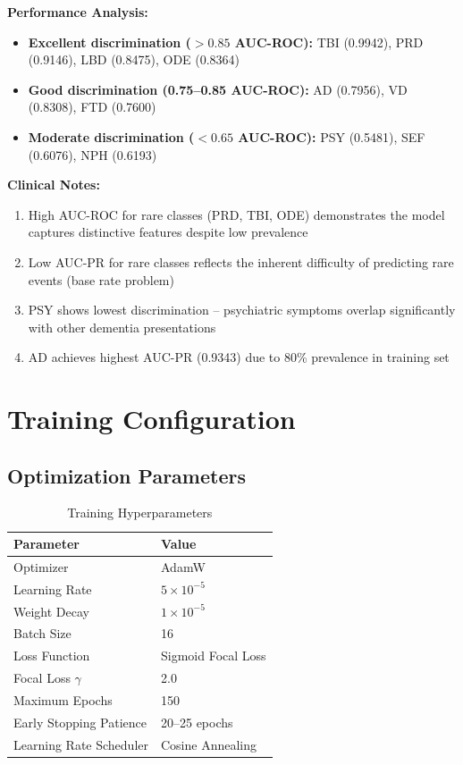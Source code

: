 \documentclass[11pt,a4paper]{article}
\begin{document}
\textbf{Performance Analysis:}
\begin{itemize}
    \item \textbf{Excellent discrimination ($>0.85$ AUC-ROC):} TBI (0.9942), PRD (0.9146), LBD (0.8475), ODE (0.8364)
    \item \textbf{Good discrimination (0.75--0.85 AUC-ROC):} AD (0.7956), VD (0.8308), FTD (0.7600)
    \item \textbf{Moderate discrimination ($<0.65$ AUC-ROC):} PSY (0.5481), SEF (0.6076), NPH (0.6193)
\end{itemize}

\textbf{Clinical Notes:}
\begin{enumerate}
    \item High AUC-ROC for rare classes (PRD, TBI, ODE) demonstrates the model captures distinctive features despite low prevalence
    \item Low AUC-PR for rare classes reflects the inherent difficulty of predicting rare events (base rate problem)
    \item PSY shows lowest discrimination -- psychiatric symptoms overlap significantly with other dementia presentations
    \item AD achieves highest AUC-PR (0.9343) due to 80\% prevalence in training set
\end{enumerate}

\section{Training Configuration}

\subsection{Optimization Parameters}

\begin{table}[H]
\centering
\caption{Training Hyperparameters}
\label{tab:training}
\begin{tabular}{@{}ll@{}}
\toprule
\textbf{Parameter} & \textbf{Value} \\
\midrule
Optimizer & AdamW \\
Learning Rate & $5 \times 10^{-5}$ \\
Weight Decay & $1 \times 10^{-5}$ \\
Batch Size & 16 \\
Loss Function & Sigmoid Focal Loss \\
Focal Loss $\gamma$ & 2.0 \\
Maximum Epochs & 150 \\
Early Stopping Patience & 20--25 epochs \\
Learning Rate Scheduler & Cosine Annealing \\
\bottomrule
\end{tabular}
\end{table}
\end{document}
